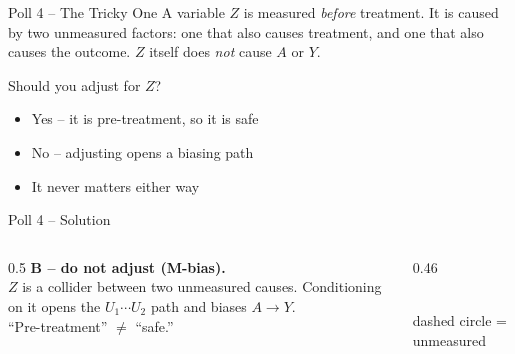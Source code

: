 \documentclass[aspectratio=169]{beamer}
\begin{document}
\begin{frame}{Poll 4 \;--\; The Tricky One}
  \small
  A variable $Z$ is measured \emph{before} treatment. It is caused by two
  unmeasured factors: one that also causes treatment, and one that also
  causes the outcome. $Z$ itself does \emph{not} cause $A$ or $Y$.
  \vspace{0.8em}

  Should you adjust for $Z$?
  \begin{itemize}
    \item[\textbf{A.}] Yes -- it is pre-treatment, so it is safe
    \item[\textbf{B.}] No -- adjusting opens a biasing path
    \item[\textbf{C.}] It never matters either way
  \end{itemize}
\end{frame}

\begin{frame}{Poll 4 \;--\; Solution}
  \small
  \begin{columns}[T]
    \begin{column}{0.5\textwidth}
      \textcolor{good}{\textbf{B -- do not adjust (M-bias).}}\\[0.4em]
      $Z$ is a collider between two unmeasured causes. Conditioning on it opens
      the $U_1\!\cdots\!U_2$ path and biases $A \to Y$.\\[0.3em]
      \textcolor{brick}{``Pre-treatment'' $\neq$ ``safe.''}
    \end{column}
    \begin{column}{0.46\textwidth}
      \centering
      \\[0.2em]
      {\scriptsize dashed circle = unmeasured}
    \end{column}
  \end{columns}
\end{frame}
\end{document}
